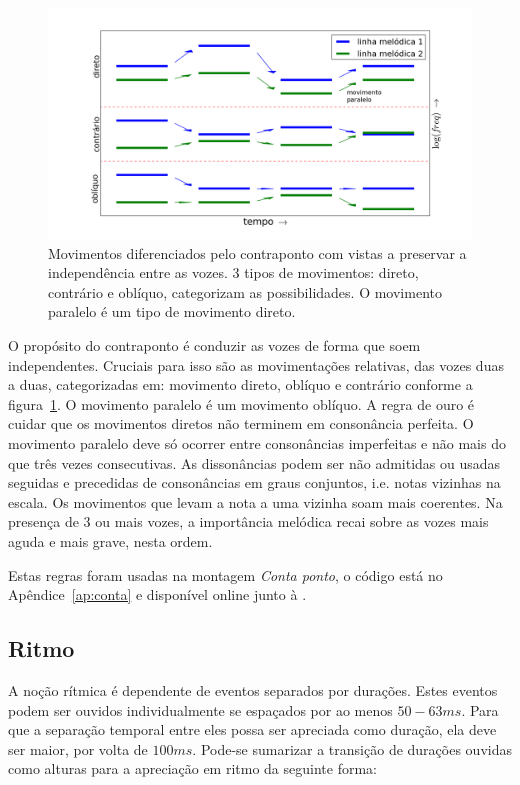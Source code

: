 \begin{figure}[h!]
    \centering
        \includegraphics[width=\textwidth]{figuras/movContraponto}
    \caption{Movimentos diferenciados pelo contraponto com vistas a preservar a independência entre as vozes. 3 tipos de movimentos: direto, contrário e oblíquo, categorizam as possibilidades. O movimento paralelo é um tipo de movimento direto.}
        \label{fig:movContraponto}
\end{figure}

O propósito do contraponto é conduzir as vozes 
de forma que soem independentes. Cruciais para isso
são as movimentações relativas, das vozes duas a duas,
categorizadas em: movimento direto, oblíquo e contrário
conforme a figura~\ref{fig:movContraponto}. O movimento paralelo
é um movimento oblíquo.
A regra de ouro é cuidar que os movimentos diretos
não terminem em consonância perfeita. O movimento paralelo
deve só ocorrer entre consonâncias imperfeitas e não mais
do que três vezes consecutivas. As dissonâncias podem
ser não admitidas ou usadas seguidas 
e precedidas de consonâncias em graus conjuntos, i.e. notas vizinhas na escala.
Os movimentos que levam a nota a uma vizinha soam mais coerentes.
Na presença de 3 ou mais vozes,
a importância melódica recai sobre as vozes mais aguda e mais grave, nesta ordem.\cite{Fux,Tragtenberg,SchoenbergContra}

Estas regras foram usadas na montagem \emph{Conta ponto}, o código está no Apêndice~\ref{ap:conta} e disponível online junto à \massa.


\subsection{Ritmo}\label{subsec:ritmo}
A noção rítmica é dependente de eventos separados por durações.\cite{Lacerda} Estes eventos podem ser ouvidos individualmente se espaçados
por ao menos $50-63ms$. Para que a separação temporal entre eles possa ser apreciada como duração, ela deve ser maior,
por volta de $100ms$.\cite{microsound} Pode-se sumarizar 
a transição
de durações ouvidas como alturas para a apreciação em ritmo da seguinte forma:\cite{Alfaix, microsound}

